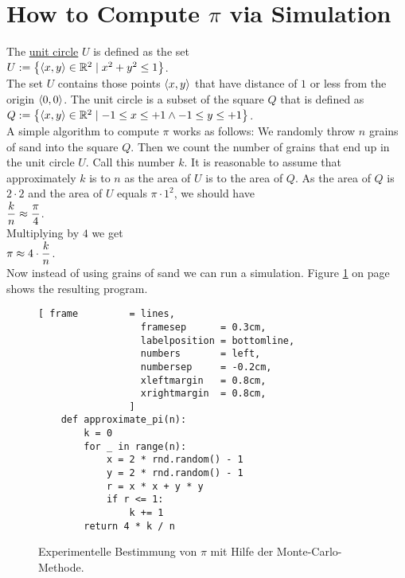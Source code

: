 \section{How to Compute $\pi$ via Simulation}
The \href{https://en.wikipedia.org/wiki/Unit_circle}{unit circle} $U$ is defined as the set 
\\[0.2cm]
\hspace*{1.3cm}
$U := \bigl\{ \pair(x,y) \in \mathbb{R}^2 \mid x^2 + y^2 \leq 1 \bigr\}$.
\\[0.2cm]
The set $U$ contains those points $\pair(x,y)$ that have distance of $1$ or less from the origin
$\pair(0,0)$.  The unit circle is a subset of the square $Q$ that is defined as 
\\[0.2cm]
\hspace*{1.3cm}
$Q := \bigl\{ \pair(x,y) \in \mathbb{R}^2 \mid -1 \leq x \leq +1 \wedge -1 \leq y \leq +1 \bigr\}$.
\\[0.2cm]
A simple algorithm to compute $\pi$ works as follows:  We randomly throw $n$ grains of sand into the square $Q$.
Then we count the number of grains that end up in the unit circle $U$.  Call this number $k$.
It is reasonable to assume that approximately $k$ is to $n$ as the area of $U$ is to the area of $Q$.  As the area of $Q$ is
$2 \cdot 2$ and the area of $U$ equals $\pi \cdot 1^2$, we should have
\\[0.2cm]
\hspace*{1.3cm}
$\displaystyle\frac{k}{n} \approx \frac{\pi}{4}$.
\\[0.2cm]
Multiplying by $4$ we get
\\[0.2cm]
\hspace*{1.3cm}
$\displaystyle \pi \approx 4 \cdot \frac{k}{n}$.
\\[0.2cm]
Now instead of using grains of sand we can run a simulation.  Figure \ref{fig:Monte-Carlo-Pi.ipynb} on page
\pageref{fig:Monte-Carlo-Pi.ipynb} shows the resulting program.


\begin{figure}[!ht]
\centering
\begin{Verbatim}[ frame         = lines, 
                  framesep      = 0.3cm, 
                  labelposition = bottomline,
                  numbers       = left,
                  numbersep     = -0.2cm,
                  xleftmargin   = 0.8cm,
                  xrightmargin  = 0.8cm,
                ]
    def approximate_pi(n):
        k = 0
        for _ in range(n):
            x = 2 * rnd.random() - 1
            y = 2 * rnd.random() - 1
            r = x * x + y * y
            if r <= 1:
                k += 1
        return 4 * k / n
\end{Verbatim}
\vspace*{-0.3cm}
\caption{Experimentelle Bestimmung von $\pi$ mit Hilfe der Monte-Carlo-Methode.}
\label{fig:Monte-Carlo-Pi.ipynb}
\end{figure}

